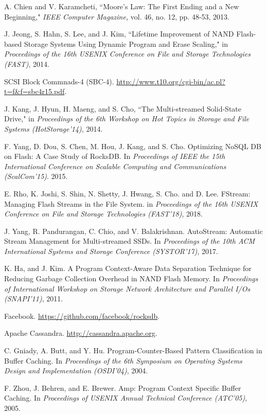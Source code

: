 \begin{thebibliography}{00}
A. Chien and V. Karamcheti,
``Moore's Law: The First Ending and a New Beginning,"
\emph{IEEE Computer Magazine,} vol. 46, no. 12, pp. 48-53, 2013.

J. Jeong, S. Hahn, S. Lee, and J. Kim,
``Lifetime Improvement of NAND Flash-based Storage Systems Using Dynamic Program and Erase Scaling,"
	in \emph{Proceedings of the 16th USENIX Conference on File and Storage Technologies (FAST)}, 2014.

SCSI Block Commnads-4 (SBC-4).
\url{http://www.t10.org/cgi-bin/ac.pl?t=f&f=sbc4r15.pdf}.

J. Kang, J. Hyun, H. Maeng, and S. Cho,
``The Multi-streamed Solid-State Drive,"
in \emph{Proceedings of the 6th Workshop on Hot Topics in Storage and File Systems (HotStorage'14)}, 2014.

F. Yang, D. Dou, S. Chen, M. Hou, J. Kang, and S. Cho.
Optimizing NoSQL DB on Flash: A Case Study of RocksDB.
In \textit{Proceedings of IEEE the 15th International Conference on Scalable Computing
and Communications (ScalCom'15)}. 2015.

E. Rho, K. Joshi, S. Shin, N. Shetty, J. Hwang, S. Cho. and D. Lee. 
FStream: Managing Flash Streams in the File System.
in \textit{Proceedings of the 16th USENIX Conference on File and Storage Technologies (FAST'18)}, 2018.

J. Yang, R. Pandurangan, C. Chio, and V. Balakrishnan.
AutoStream: Automatic Stream Management for Multi-streamed SSDs.
In \textit{Proceedings of the 10th ACM International Systems and Storage Conference (SYSTOR'17)}, 2017.

K. Ha, and J. Kim.
A Program Context-Aware Data Separation Technique for Reducing Garbage Collection Overhead in NAND Flash Memory.
In \textit{Proceedings of International Workshop on Storage Network Architecture 
and Parallel I/Os (SNAPI'11)}, 2011.

Facebook. 
\url{https://github.com/facebook/rocksdb}.

Apache Cassandra. 
\url{http://cassandra.apache.org}.

C. Gniady, A. Butt, and Y. Hu.
Program-Counter-Based Pattern Classification in Buffer Caching.
In \textit{Proceedings of the 6th Symposium on Operating Systems Design and Implementation (OSDI'04)}, 2004.

F. Zhou, J. Behren, and E. Brewer.
Amp: Program Context Specific Buffer Caching.
In \textit{Proceedings of USENIX Annual Technical Conference (ATC'05)}, 2005.


\end{thebibliography}
